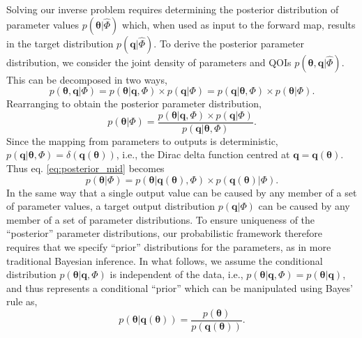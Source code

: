 Solving our inverse problem requires determining the posterior distribution of parameter values $p(\boldsymbol{\theta}|\hat{\Phi})$  which, when used as input to the forward map, results in the target distribution $p(\boldsymbol{q}|\hat{\Phi})$. To derive the posterior parameter distribution, we consider the joint density of parameters and QOIs $p(\boldsymbol{\theta},\boldsymbol{q}|\hat{\Phi})$. This can be decomposed in two ways,
%
\begin{equation}\label{eq:joint}
  p( \boldsymbol{\theta}, \boldsymbol{q}|\Phi)
= p( \boldsymbol{\theta}|\boldsymbol{q}, \Phi) \times p(\boldsymbol{q}|\Phi)
= p( \boldsymbol{q}|\boldsymbol{\theta}, \Phi ) \times p(\boldsymbol{\theta}|\Phi).
\end{equation}
%
Rearranging to obtain the posterior parameter distribution,
%
\begin{equation}\label{eq:posterior_mid}
p(\boldsymbol{\theta}|\Phi)
= \frac{p(\boldsymbol{\theta}|\boldsymbol{q}, \Phi) \times p(\boldsymbol{q}|\Phi)}{p(\boldsymbol{q}| \boldsymbol{\theta}, \Phi)}.
\end{equation}
%
Since the mapping from parameters to outputs is deterministic,
$p(\boldsymbol{q}| \boldsymbol{\theta}, \Phi)=\delta(\boldsymbol{q}(\boldsymbol{\theta}))$, i.e., the Dirac delta function centred at $\boldsymbol{q}=\boldsymbol{q}(\boldsymbol{\theta})$. Thus eq. \eqref{eq:posterior_mid} becomes
%
\begin{equation}\label{eq:posterior_mid1}
p(\boldsymbol{\theta}|\Phi)
= p(\boldsymbol{\theta}|\boldsymbol{q}(\boldsymbol{\theta}), \Phi) \times p(\boldsymbol{q}(\boldsymbol{\theta})|\Phi).
\end{equation}
%
In the same way that a single output value can be caused by any member of a set of parameter values, a target output distribution $p(\boldsymbol{q}|\Phi)$ can be caused by any member of a set of parameter distributions. To ensure uniqueness of the ``posterior'' parameter distributions, our probabilistic framework therefore requires that we specify ``prior'' distributions for the parameters, as in more traditional Bayesian inference. In what follows, we assume the conditional distribution $p(\boldsymbol{\theta}|\boldsymbol{q}, \Phi)$ is independent of the data, i.e., $p(\boldsymbol{\theta}|\boldsymbol{q}, \Phi)=p(\boldsymbol{\theta}|\boldsymbol{q})$, and thus represents a conditional ``prior'' which can be manipulated using Bayes' rule as,
%
\begin{equation}\label{eq:prior}
p(\boldsymbol{\theta}|\boldsymbol{q}(\boldsymbol{\theta})) = \frac{p(\boldsymbol{\theta})}{p(\boldsymbol{q}(\boldsymbol{\theta}))}.
\end{equation}
